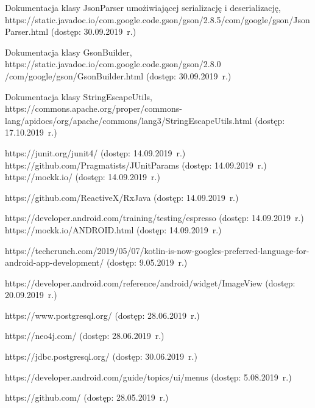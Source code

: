 \begin{thebibliography}{3}
   Dokumentacja klasy JsonParser umożiwiającej serializację i deserializację, https://static.javadoc.io/com.google.code.gson/gson/2.8.5/com/google/gson/JsonParser.html (dostęp: 30.09.2019~r.)

   Dokumentacja klasy GsonBuilder, https://static.javadoc.io/com.google.code.gson/gson/2.8.0\\/com/google/gson/GsonBuilder.html (dostęp: 30.09.2019~r.)

   Dokumentacja klasy StringEscapeUtils, https://commons.apache.org/proper/commons-lang/apidocs/org/apache/commons/lang3/StringEscapeUtils.html (dostęp: 17.10.2019~r.)
  
   https://junit.org/junit4/ (dostęp: 14.09.2019~r.)
   https://github.com/Pragmatists/JUnitParams (dostęp: 14.09.2019~r.)
   https://mockk.io/ (dostęp: 14.09.2019~r.)
  
   https://github.com/ReactiveX/RxJava (dostęp: 14.09.2019~r.) 
  
   https://developer.android.com/training/testing/espresso (dostęp: 14.09.2019~r.)
   https://mockk.io/ANDROID.html (dostęp: 14.09.2019~r.)
  
   https://techcrunch.com/2019/05/07/kotlin-is-now-googles-preferred-language-for-android-app-development/ (dostęp: 9.05.2019~r.)
  
   https://developer.android.com/reference/android/widget/ImageView (dostęp: 20.09.2019~r.)
  
   https://www.postgresql.org/ (dostęp: 28.06.2019~r.)
  
   https://neo4j.com/ (dostęp: 28.06.2019~r.)
  
   https://jdbc.postgresql.org/ (dostęp: 30.06.2019~r.)
  
   https://developer.android.com/guide/topics/ui/menus (dostęp: 5.08.2019~r.)
  
   https://github.com/ (dostęp: 28.05.2019~r.)

  
\end{thebibliography}